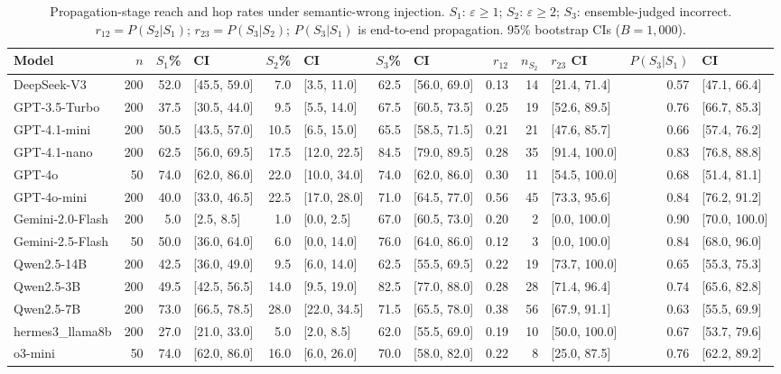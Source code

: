 \begin{table}[t]
\centering
\caption{Propagation-stage reach and hop rates under semantic-wrong injection. $S_1$: $\varepsilon \geq 1$; $S_2$: $\varepsilon \geq 2$; $S_3$: ensemble-judged incorrect. $r_{12} = P(S_2 | S_1)$; $r_{23} = P(S_3 | S_2)$; $P(S_3 | S_1)$ is end-to-end propagation. 95\% bootstrap CIs ($B = 1{,}000$).}
\label{tab:hop}
\small
\begin{tabular}{l r r l r l r l r r l r l}
\toprule
Model & $n$ & $S_1$\% & CI & $S_2$\% & CI & $S_3$\% & CI & $r_{12}$ & $n_{S_2}$ & $r_{23}$ CI & $P(S_3|S_1)$ & CI \\
\midrule
DeepSeek-V3 & 200 & 52.0 & [45.5, 59.0] & 7.0 & [3.5, 11.0] & 62.5 & [56.0, 69.0] & 0.13 & 14 & [21.4, 71.4] & 0.57 & [47.1, 66.4] \\
GPT-3.5-Turbo & 200 & 37.5 & [30.5, 44.0] & 9.5 & [5.5, 14.0] & 67.5 & [60.5, 73.5] & 0.25 & 19 & [52.6, 89.5] & 0.76 & [66.7, 85.3] \\
GPT-4.1-mini & 200 & 50.5 & [43.5, 57.0] & 10.5 & [6.5, 15.0] & 65.5 & [58.5, 71.5] & 0.21 & 21 & [47.6, 85.7] & 0.66 & [57.4, 76.2] \\
GPT-4.1-nano & 200 & 62.5 & [56.0, 69.5] & 17.5 & [12.0, 22.5] & 84.5 & [79.0, 89.5] & 0.28 & 35 & [91.4, 100.0] & 0.83 & [76.8, 88.8] \\
GPT-4o & 50 & 74.0 & [62.0, 86.0] & 22.0 & [10.0, 34.0] & 74.0 & [62.0, 86.0] & 0.30 & 11 & [54.5, 100.0] & 0.68 & [51.4, 81.1] \\
GPT-4o-mini & 200 & 40.0 & [33.0, 46.5] & 22.5 & [17.0, 28.0] & 71.0 & [64.5, 77.0] & 0.56 & 45 & [73.3, 95.6] & 0.84 & [76.2, 91.2] \\
Gemini-2.0-Flash & 200 & 5.0 & [2.5, 8.5] & 1.0 & [0.0, 2.5] & 67.0 & [60.5, 73.0] & 0.20 & 2 & [0.0, 100.0] & 0.90 & [70.0, 100.0] \\
Gemini-2.5-Flash & 50 & 50.0 & [36.0, 64.0] & 6.0 & [0.0, 14.0] & 76.0 & [64.0, 86.0] & 0.12 & 3 & [0.0, 100.0] & 0.84 & [68.0, 96.0] \\
Qwen2.5-14B & 200 & 42.5 & [36.0, 49.0] & 9.5 & [6.0, 14.0] & 62.5 & [55.5, 69.5] & 0.22 & 19 & [73.7, 100.0] & 0.65 & [55.3, 75.3] \\
Qwen2.5-3B & 200 & 49.5 & [42.5, 56.5] & 14.0 & [9.5, 19.0] & 82.5 & [77.0, 88.0] & 0.28 & 28 & [71.4, 96.4] & 0.74 & [65.6, 82.8] \\
Qwen2.5-7B & 200 & 73.0 & [66.5, 78.5] & 28.0 & [22.0, 34.5] & 71.5 & [65.5, 78.0] & 0.38 & 56 & [67.9, 91.1] & 0.63 & [55.5, 69.9] \\
hermes3_llama8b & 200 & 27.0 & [21.0, 33.0] & 5.0 & [2.0, 8.5] & 62.0 & [55.5, 69.0] & 0.19 & 10 & [50.0, 100.0] & 0.67 & [53.7, 79.6] \\
o3-mini & 50 & 74.0 & [62.0, 86.0] & 16.0 & [6.0, 26.0] & 70.0 & [58.0, 82.0] & 0.22 & 8 & [25.0, 87.5] & 0.76 & [62.2, 89.2] \\
\bottomrule
\end{tabular}
\end{table}